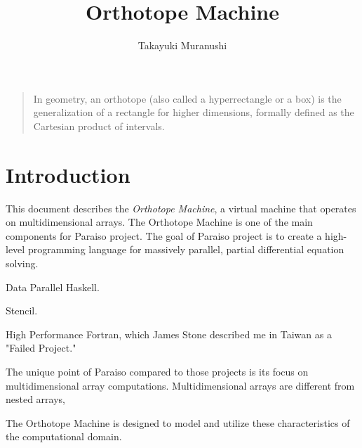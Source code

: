 \documentclass{article}
\title{Orthotope Machine}
\author{Takayuki Muranushi}
\begin{document}
\maketitle
\begin{quote}
  In geometry, an orthotope (also called a hyperrectangle or a box) is
  the generalization of a rectangle for higher dimensions, formally
  defined as the Cartesian product of intervals.
\end{quote}

\section{Introduction}

This document describes the {\em Orthotope Machine}, a virtual machine
that operates on multidimensional arrays. The Orthotope Machine is one
of the main components for Paraiso project. The goal of Paraiso
project is to create a high-level programming language for massively
parallel, partial differential equation solving.

Data Parallel Haskell\cite{nested-data-parallelism}.

Stencil.

High Performance Fortran, which James Stone described me in Taiwan as
a "Failed Project." 

The unique point of Paraiso compared to those projects is its focus on
multidimensional array computations. Multidimensional
arrays are different from nested arrays, 

The Orthotope Machine is designed to model and utilize these
characteristics of the computational domain.


\end{document}
